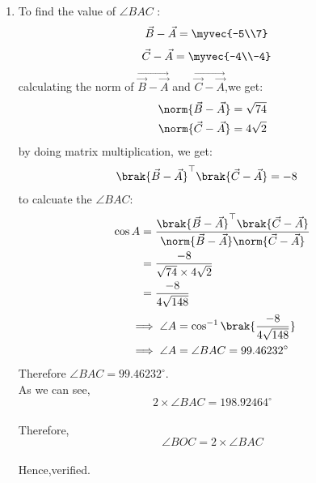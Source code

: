 \documentclass[journal,12pt,twocolumn]{IEEEtran}
\theoremstyle{remark}
\begin{document}
\begin{enumerate}
	\item To find  the value of $\angle{BAC}$ :
\begin{align}
\Vec{B}-\Vec{A}
         & =\myvec{-5\\7}
\end{align}
\vspace{0.1cm}
\begin{align}
\Vec{C}-\Vec{A}
          &=\myvec{-4\\-4}
\end{align}
\vspace{0.1cm}
calculating the norm of $\Vec{\Vec{B}-\Vec{A}}$ and $\Vec{\Vec{C}-\Vec{A}}$,we get:
\begin{align}
	\norm{\Vec{B}-\Vec{A}}&= \sqrt{74}\\
	\norm{\Vec{C}-\Vec{A}}&= 4\sqrt{2}
\end{align}
\vspace{0.2cm}
by doing matrix multiplication, we get:
\begin{align}
\brak{\Vec{B}-\Vec{A}}^{\top}\brak{\Vec{C}-\Vec{A}}&=-8
\end{align}
\vspace{0.2cm}
to calcuate the $\angle{BAC}$:
\begin{align}
	\cos{A}&=\frac{\brak{\Vec{B}-\Vec{A}}^{\top}\brak{\Vec{C}-\Vec{A}}}{\norm{\Vec{B}-\Vec{A}}\norm{\Vec{C}-\Vec{A}}}\\
&=\frac{-8}{\sqrt{74}\times4\sqrt{2}}\\
&=\frac{-8}{4\sqrt{148}}
\end{align}
\vspace{0.1cm}
\begin{align}
&\implies\angle{A}=\cos^{-1}\brak{\frac{-8}{4\sqrt{148}}}\\
&\implies\angle{A}=\angle{BAC}=99.46232^{\circ}
\end{align}
\vspace{0.4cm}
Therefore $\angle{BAC}=99.46232^{\circ}$.\\
\vspace{0.5cm}
As we can see,$$2\times\angle{BAC}=198.92464^{\circ} $$\\Therefore, $$\angle{BOC}=2\times\angle{BAC}$$\\
Hence,verified.

\end{enumerate}
\end{document}
